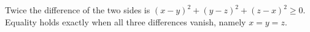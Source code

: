 Twice the difference of the two sides is $(x-y)^2+(y-z)^2+(z-x)^2\ge0$. Equality holds exactly when all three differences vanish, namely $\boxed{x=y=z}$.
